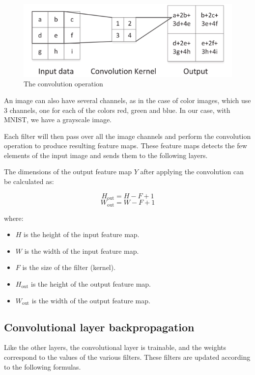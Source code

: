 \documentclass[a4paper, twocolumn, twoside]{article}
\begin{document}
    \begin{figure}[H]
		\begin{center}
			\includegraphics[width=\columnwidth]{images/convolution.png}
		\end{center}
		\caption{The convolution operation}
	\end{figure}

    An image can also have several channels, as in the case of color images, which use 3 channels, one for each of the colors red, green and blue. In our case, with MNIST, we have a grayscale image.
    
    Each filter will then pass over all the image channels and perform the convolution operation to produce resulting feature maps. These feature maps detects the few elements of the input image and sends them to the following layers. 
    
    The dimensions of the output feature map \( Y \) after applying the convolution can be calculated as:

    \[
    H_{\text{out}} = H - F + 1
    \]
    \[
    W_{\text{out}} = W - F + 1
    \]
    
    where:
    \begin{itemize}
      \item \( H \) is the height of the input feature map.
      \item \( W \) is the width of the input feature map.
      \item \( F \) is the size of the filter (kernel).
      \item \( H_{\text{out}} \) is the height of the output feature map.
      \item \( W_{\text{out}} \) is the width of the output feature map.
    \end{itemize}

    \subsection{Convolutional layer backpropagation}
    Like the other layers, the convolutional layer is trainable, and the weights correspond to the values of the various filters. These filters are updated according to the following formulas.
\end{document}

